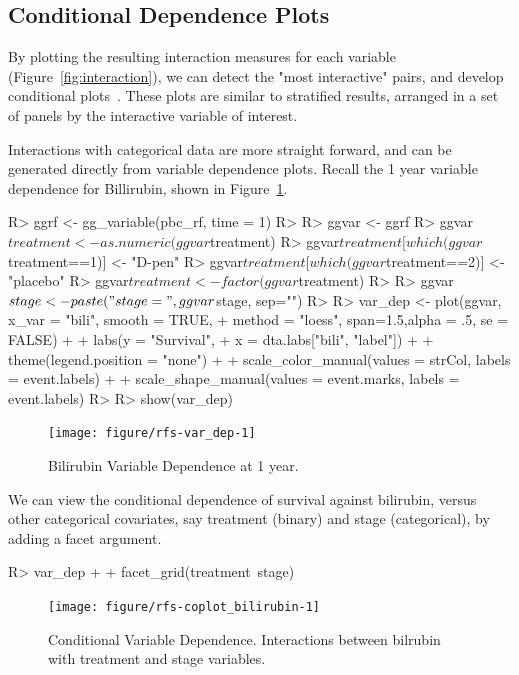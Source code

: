 \documentclass[nojss]{jss}\usepackage[]{graphicx}\usepackage[]{color}
\begin{document}
\subsection{Conditional Dependence Plots}

By plotting the resulting interaction measures for each variable (Figure~\ref{fig:interaction}), we can detect the "most interactive" pairs, and develop conditional plots~\cite{chambers:1992, cleveland:1993}. These plots are similar to stratified results, arranged in a set of panels by the interactive variable of interest. 

Interactions with categorical data are more straight forward, and can be generated directly from variable dependence plots. Recall the 1 year variable dependence for Billirubin, shown in Figure~\ref{fig:var_dep}. 
\begin{Schunk}
\begin{Sinput}
R> ggrf <- gg_variable(pbc_rf, time = 1)
R> 
R> ggvar <- ggrf
R> ggvar$treatment <- as.numeric(ggvar$treatment)
R> ggvar$treatment[which(ggvar$treatment==1)] <- "D-pen" 
R> ggvar$treatment[which(ggvar$treatment==2)] <- "placebo" 
R> ggvar$treatment <- factor(ggvar$treatment)
R> 
R> ggvar$stage <- paste("stage=", ggvar$stage, sep="")
R> 
R> var_dep <- plot(ggvar, x_var = "bili", smooth = TRUE, 
+                 method = "loess", span=1.5,alpha = .5, se = FALSE) + 
+   labs(y = "Survival", 
+        x = dta.labs["bili", "label"]) + 
+   theme(legend.position = "none") + 
+   scale_color_manual(values = strCol, labels = event.labels) + 
+   scale_shape_manual(values = event.marks, labels = event.labels)
R> 
R> show(var_dep)
\end{Sinput}
\begin{figure}[!htpb]

{\centering \texttt{[image: figure/rfs-var\_dep-1]} 

}

\caption[Bilirubin Variable Dependence at 1 year]{Bilirubin Variable Dependence at 1 year.\label{fig:var_dep}}
\end{figure}
\end{Schunk}

We can view the conditional dependence of survival against bilirubin, versus other categorical covariates, say treatment (binary) and stage (categorical), by adding a facet argument.
\begin{Schunk}
\begin{Sinput}
R> var_dep + 
+   facet_grid(treatment~stage)
\end{Sinput}
\begin{figure}[!htpb]

{\centering \texttt{[image: figure/rfs-coplot\_bilirubin-1]} 

}

\caption[Conditional Variable Dependence]{Conditional Variable Dependence. Interactions between bilrubin with treatment and stage variables.\label{fig:coplot_bilirubin}}
\end{figure}
\end{Schunk}
\end{document}
